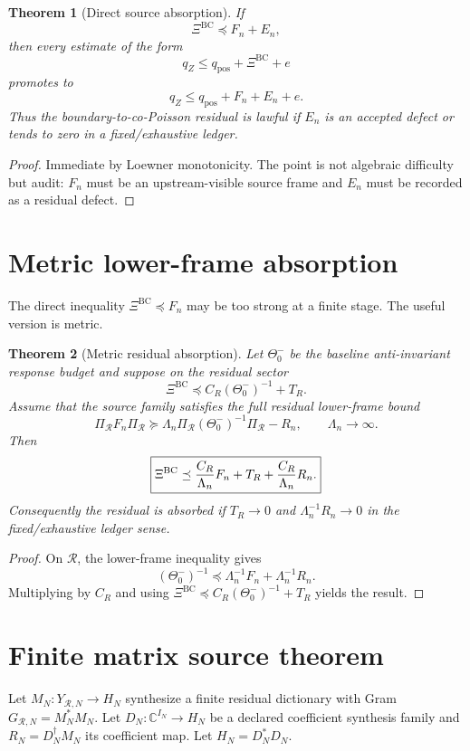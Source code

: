 \documentclass[11pt]{article}
\newtheorem{theorem}{Theorem}
\newcommand{\XiBC}{\Xi^{\mathrm{BC}}}
\begin{document}
\begin{theorem}[Direct source absorption]
If
\[
\XiBC\preceq F_n+E_n,
\]
then every estimate of the form
\[
q_Z\le q_{\mathrm{pos}}+\XiBC+e
\]
promotes to
\[
q_Z\le q_{\mathrm{pos}}+F_n+E_n+e.
\]
Thus the boundary-to-co-Poisson residual is lawful if $E_n$ is an accepted defect
or tends to zero in a fixed/exhaustive ledger.
\end{theorem}

\begin{proof}
Immediate by Loewner monotonicity. The point is not algebraic difficulty but audit:
$F_n$ must be an upstream-visible source frame and $E_n$ must be recorded as a
residual defect.
\end{proof}

\section{Metric lower-frame absorption}
The direct inequality $\XiBC\preceq F_n$ may be too strong at a finite stage. The useful version is metric.

\begin{theorem}[Metric residual absorption]
Let $\Theta_0^-$ be the baseline anti-invariant response budget and suppose on the residual sector
\[
\boxed{\XiBC\preceq C_R(\Theta_0^-)^{-1}+T_R.}
\]
Assume that the source family satisfies the full residual lower-frame bound
\[
\boxed{\Pi_{\mathcal R}F_n\Pi_{\mathcal R}\succeq
\Lambda_n\Pi_{\mathcal R}(\Theta_0^-)^{-1}\Pi_{\mathcal R}-R_n,\qquad \Lambda_n\to\infty.}
\]
Then
\[
\boxed{\XiBC\preceq {C_R\over \Lambda_n}F_n+T_R+{C_R\over\Lambda_n}R_n.}
\]
Consequently the residual is absorbed if $T_R\to0$ and $\Lambda_n^{-1}R_n\to0$ in the fixed/exhaustive ledger sense.
\end{theorem}

\begin{proof}
On $\mathcal R$, the lower-frame inequality gives
\[
(\Theta_0^-)^{-1}\preceq \Lambda_n^{-1}F_n+\Lambda_n^{-1}R_n.
\]
Multiplying by $C_R$ and using $\XiBC\preceq C_R(\Theta_0^-)^{-1}+T_R$ yields the result.
\end{proof}

\section{Finite matrix source theorem}
Let $M_N:Y_{\mathcal R,N}\to H_N$ synthesize a finite residual dictionary with Gram
$G_{\mathcal R,N}=M_N^*M_N$. Let $D_N:\mathbb C^{I_N}\to H_N$ be a declared coefficient synthesis family and
$R_N=D_N^\dagger M_N$ its coefficient map. Let $H_N=D_N^*D_N$.
\end{document}

